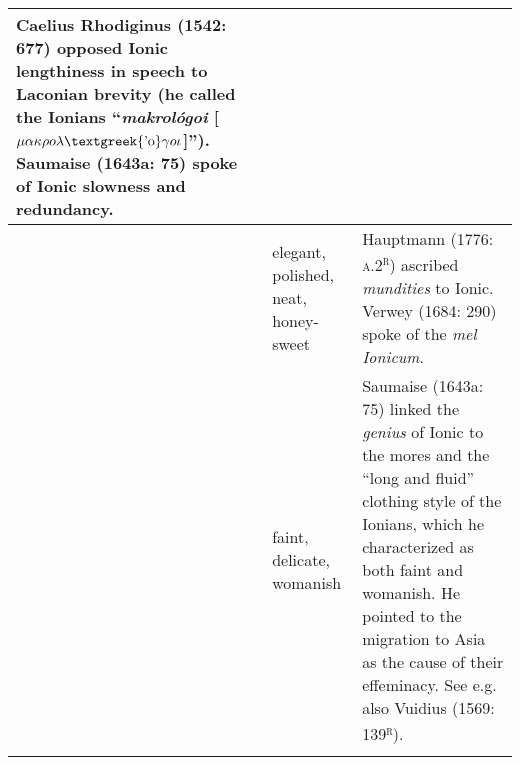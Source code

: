 \documentclass[12pt]{article}
\begin{document}
\begin{flushleft}
\begin{supertabular}{m{0.5976598in}|m{1.4962599in}|m{3.9233599in}|}
Caelius Rhodiginus (1542: 677) opposed Ionic lengthiness in speech to Laconian brevity (he called the Ionians “\textit{makrológoi} [$\mu \alpha \kappa \rho o\lambda \text{\textgreek{'o}}\gamma o\iota $]”). Saumaise (1643a: 75) spoke of Ionic slowness and redundancy.\\\hline
 &
elegant, polished, neat, honey-sweet &
Hauptmann (1776: \textsc{a.2}\textsc{\textsuperscript{r}}) ascribed \textit{mundities} to Ionic. Verwey (1684: 290) spoke of the \textit{mel Ionicum}.\\\hhline{~--}
 &
faint, delicate, womanish &
Saumaise (1643a: 75) linked the \textit{genius} of Ionic to the mores and the “long and fluid” clothing style of the Ionians, which he characterized as both faint and womanish. He pointed to the migration to Asia as the cause of their effeminacy. See e.g. also Vuidius (1569: 139\textsc{\textsuperscript{r}}).\\\hhline{~--}
\end{supertabular}
\end{flushleft}
\end{document}
